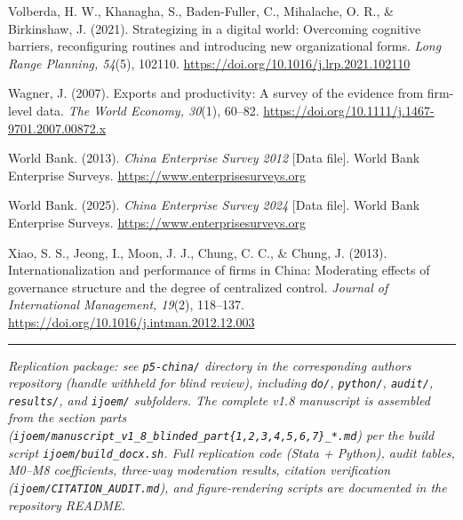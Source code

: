 \documentclass[12pt,a4paper]{article}
\begin{document}
Volberda, H. W., Khanagha, S., Baden-Fuller, C., Mihalache, O. R., \&
Birkinshaw, J. (2021). Strategizing in a digital world: Overcoming
cognitive barriers, reconfiguring routines and introducing new
organizational forms. \emph{Long Range Planning, 54}(5), 102110.
\url{https://doi.org/10.1016/j.lrp.2021.102110}

Wagner, J. (2007). Exports and productivity: A survey of the evidence
from firm-level data. \emph{The World Economy, 30}(1), 60--82.
\url{https://doi.org/10.1111/j.1467-9701.2007.00872.x}

World Bank. (2013). \emph{China Enterprise Survey 2012} {[}Data file{]}.
World Bank Enterprise Surveys. \url{https://www.enterprisesurveys.org}

World Bank. (2025). \emph{China Enterprise Survey 2024} {[}Data file{]}.
World Bank Enterprise Surveys. \url{https://www.enterprisesurveys.org}

Xiao, S. S., Jeong, I., Moon, J. J., Chung, C. C., \& Chung, J. (2013).
Internationalization and performance of firms in China: Moderating
effects of governance structure and the degree of centralized control.
\emph{Journal of International Management, 19}(2), 118--137.
\url{https://doi.org/10.1016/j.intman.2012.12.003}

\begin{center}\rule{0.5\linewidth}{0.5pt}\end{center}

\emph{Replication package: see \texttt{p5-china/} directory in the
corresponding author\textquotesingle s repository (handle withheld for
blind review), including \texttt{do/}, \texttt{python/},
\texttt{audit/}, \texttt{results/}, and \texttt{ijoem/} subfolders. The
complete v1.8 manuscript is assembled from the section parts
(\texttt{ijoem/manuscript\_v1\_8\_blinded\_part\{1,2,3,4,5,6,7\}\_*.md})
per the build script \texttt{ijoem/build\_docx.sh}. Full replication
code (Stata + Python), audit tables, M0--M8 coefficients, three-way
moderation results, citation verification
(\texttt{ijoem/CITATION\_AUDIT.md}), and figure-rendering scripts are
documented in the repository README.}
\end{document}
